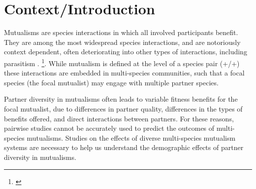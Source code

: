 \documentclass[12pt,a4paper]{article}
\newcommand{\ali}[2]{{\color{pink}{#1}}\footnote{\textit{\color{pink}{#2}}}}
\begin{document}
\section*{Context/Introduction}

Mutualisms are species interactions in which all involved participants benefit. They are among the most widespread species interactions\cite{Chamberlain2014,BoucherDouglasH.1985}, and are notoriously context dependent\cite{Bronstein1994,Chamberlain2014,Frederickson2013}, often deteriorating into other types of interactions, including parasitism \cite{Rodriguez-Rodriguez2017,Song2020,Mandyam2014,Thrall2007}.
\ali{The benefits from these interactions are called rewards, but they require investment of resources into the interaction}{I'm honestly not sure if I need to explain this idea? Do I need to include more basic mutualism background? I have tried to shift this so that I cover a small amount and then jump into the idea of partner diversity in mutualisms instead}. 
While mutualism is defined at the level of a species pair (+/+) these interactions are embedded in multi-species communities, such that a focal species (the focal mutualist) may engage with multiple partner species.

Partner diversity in mutualisms often leads to variable fitness benefits for the focal mutualist\cite{Afkhami2014, Palmer2010}, due to differences in partner quality\cite{Bascompte2019,Stanton2013,Frederickson2013,Jones2015}, differences in the types of benefits offered\cite{Kiers2003,Afkhami2014}, and direct interactions between partners\cite{Sun2019,Heath2009,Heath2014,Grutter2003}.
For these reasons, pairwise studies cannot be accurately used to predict the outcomes of multi-species mutualisms\cite{Palmer2010, Stanton2013. Chamberlain2014, Song2020}.
Studies on the effects of diverse multi-species mutualism systems are necessary to help us understand the demographic effects of partner diversity in mutualisms. 
\end{document}
